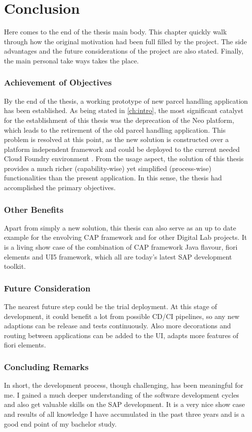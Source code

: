 \chapter*{Conclusion}
\label{ch:sum}


Here comes to the end of the thesis main body.
This chapter quickly walk through how the original motivation had been full filled by the project. The side advantages and the future considerations of the project are also stated. Finally, the main personal take ways takes the place.

\subsection{Achievement of Objectives}
By the end of the thesis, a working prototype of new parcel handling application has been established.
As being stated in \autoref{ch:intro}, the most significant catalyst for the establishment of this thesis was the deprecation of the Neo platform, which leads to the retirement of the old parcel handling application. This problem is resolved at this point, as the new solution is constructed over a platform independent framework and could be deployed to the current needed Cloud Foundry environment \cite{cf}. From the usage aspect, the solution of this thesis provides a much richer (capability-wise) yet simplified (process-wise) functionalities than the present application. In this sense, the thesis had accomplished the primary objectives.

\subsection{Other Benefits}
Apart from simply a new solution, this thesis can also serve as an up to date example for the envolving CAP framework and for other Digital Lab projects. It is a living show case of the combination of CAP framework Java flavour, fiori elements and UI5 framework, which all are today's latest SAP development toolkit. 

\subsection{Future Consideration}
The nearest future step could be the trial deployment. At this stage of development, it could benefit a lot from possible CD/CI pipelines, so any new adaptions can be release and tests continuously. Also more decorations and routing between applications can be added to the UI, adapts more features of fiori elements.

\subsection{Concluding Remarks}
In short, the development process, though challenging, has been meaningful for me. I gained a much deeper understanding of the software development cycles and also get valuable skills on the SAP development. It is a very nice show case and results of all knowledge I have accumulated in the past three years and is a good end point of my bachelor study.
